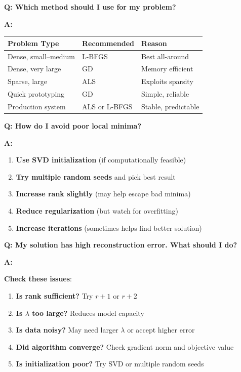 \documentclass[11pt,oneside]{article}
\newcommand{\question}[1]{\textbf{Q: #1}}
\newcommand{\answer}{\textbf{A: }}
\begin{document}
\question{Which method should I use for my problem?}

\answer

\begin{table}[h]
\centering
\begin{tabular}{lll}
\toprule
\textbf{Problem Type} & \textbf{Recommended} & \textbf{Reason} \\
\midrule
Dense, small--medium & L-BFGS & Best all-around \\
Dense, very large & GD & Memory efficient \\
Sparse, large & ALS & Exploits sparsity \\
Quick prototyping & GD & Simple, reliable \\
Production system & ALS or L-BFGS & Stable, predictable \\
\bottomrule
\end{tabular}
\end{table}

\medskip

\question{How do I avoid poor local minima?}

\answer

\begin{enumerate}
    \item \textbf{Use SVD initialization} (if computationally feasible)
    \item \textbf{Try multiple random seeds} and pick best result
    \item \textbf{Increase rank slightly} (may help escape bad minima)
    \item \textbf{Reduce regularization} (but watch for overfitting)
    \item \textbf{Increase iterations} (sometimes helps find better solution)
\end{enumerate}

\medskip

\question{My solution has high reconstruction error. What should I do?}

\answer

\textbf{Check these issues}:

\begin{enumerate}
    \item \textbf{Is rank sufficient?} Try $r + 1$ or $r + 2$
    \item \textbf{Is $\lambda$ too large?} Reduces model capacity
    \item \textbf{Is data noisy?} May need larger $\lambda$ or accept higher error
    \item \textbf{Did algorithm converge?} Check gradient norm and objective value
    \item \textbf{Is initialization poor?} Try SVD or multiple random seeds
\end{enumerate}
\end{document}

